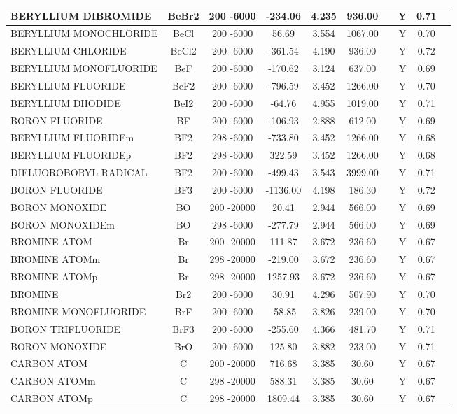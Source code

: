 \begin{longtable}{@{\extracolsep{\fill}}|l|c|c|c|c|c|c|c|c|l|}
BERYLLIUM DIBROMIDE&BeBr2&200 -6000& -234.06& 4.235&   936.00& &Y& 0.71&\\ \hline
BERYLLIUM MONOCHLORIDE&BeCl&200 -6000&   56.69& 3.554&  1067.00& &Y& 0.70&\\ \hline
BERYLLIUM CHLORIDE&BeCl2&200 -6000& -361.54& 4.190&   936.00& &Y& 0.72&\\ \hline
BERYLLIUM MONOFLUORIDE&BeF&200 -6000& -170.62& 3.124&   637.00& &Y& 0.69&\\ \hline
BERYLLIUM FLUORIDE&BeF2&200 -6000& -796.59& 3.452&  1266.00& &Y& 0.70&\\ \hline
BERYLLIUM DIIODIDE&BeI2&200 -6000&  -64.76& 4.955&  1019.00& &Y& 0.71&\\ \hline
BORON FLUORIDE&BF&200 -6000& -106.93& 2.888&   612.00& &Y& 0.69&\\ \hline
BERYLLIUM FLUORIDEm&BF2&298 -6000& -733.80& 3.452&  1266.00& &Y& 0.68&\\ \hline
BERYLLIUM FLUORIDEp&BF2&298 -6000&  322.59& 3.452&  1266.00& &Y& 0.68&\\ \hline
DIFLUOROBORYL RADICAL&BF2&200 -6000& -499.43& 3.543&  3999.00& &Y& 0.71&\\ \hline
BORON FLUORIDE&BF3&200 -6000&-1136.00& 4.198&   186.30& &Y& 0.72&\\ \hline
BORON MONOXIDE&BO&200 -20000&   20.41& 2.944&   566.00& &Y& 0.69&\\ \hline
BORON MONOXIDEm&BO&298 -6000& -277.79& 2.944&   566.00& &Y& 0.69&\\ \hline
BROMINE ATOM&Br&200 -20000&  111.87& 3.672&   236.60& &Y& 0.67&\\ \hline
BROMINE ATOMm&Br&298 -20000& -219.00& 3.672&   236.60& &Y& 0.67&\\ \hline
BROMINE ATOMp&Br&298 -20000& 1257.93& 3.672&   236.60& &Y& 0.67&\\ \hline
BROMINE&Br2&200 -6000&   30.91& 4.296&   507.90& &Y& 0.70&\\ \hline
BROMINE MONOFLUORIDE&BrF&200 -6000&  -58.85& 3.826&   239.00& &Y& 0.70&\\ \hline
BORON TRIFLUORIDE&BrF3&200 -6000& -255.60& 4.366&   481.70& &Y& 0.71&\\ \hline
BORON MONOXIDE&BrO&200 -6000&  125.80& 3.882&   233.00& &Y& 0.71&\\ \hline
CARBON ATOM&C&200 -20000&  716.68& 3.385&    30.60& &Y& 0.67&\\ \hline
CARBON ATOMm&C&298 -20000&  588.31& 3.385&    30.60& &Y& 0.67&\\ \hline
CARBON ATOMp&C&298 -20000& 1809.44& 3.385&    30.60& &Y& 0.67&\\ \hline

\end{longtable}
